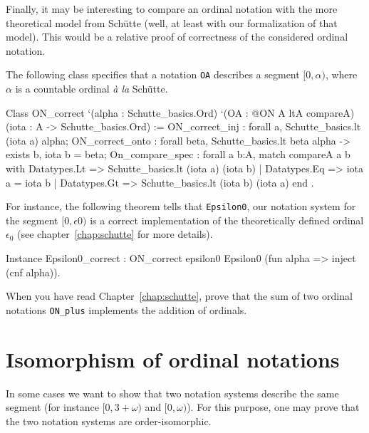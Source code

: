 Finally, it may be interesting to compare an ordinal notation with the more theoretical model from Schütte (well, at least with our formalization of that model). This would be a relative proof of correctness of the considered  ordinal  notation.

The following class specifies that a notation \texttt{OA} describes a segment $[0,\alpha)$,
where $\alpha$ is a countable ordinal \emph{à la}  Schütte.


\label{types:ON-for}

\begin{Coqsrc}
Class ON_correct `(alpha : Schutte_basics.Ord)
     `(OA : @ON A ltA  compareA)
      (iota : A -> Schutte_basics.Ord) :=
  { ON_correct_inj : forall a, Schutte_basics.lt (iota a) alpha;
    ON_correct_onto : forall beta, Schutte_basics.lt beta alpha ->
                                exists b, iota b = beta;
    On_compare_spec : forall a b:A,
        match compareA a b with
          Datatypes.Lt => Schutte_basics.lt (iota a) (iota b)
        | Datatypes.Eq => iota a = iota b
        | Datatypes.Gt => Schutte_basics.lt (iota b) (iota a)
        end
}.
\end{Coqsrc}



For instance, the following theorem tells that \texttt{Epsilon0}, our notation system for the segment $[0,\epsilon0)$ is a correct implementation of the theoretically defined  ordinal $\epsilon_0$
(see chapter~\ref{chap:schutte} for more details).


\begin{Coqsrc}
Instance Epsilon0_correct :
  ON_correct epsilon0 Epsilon0  (fun alpha => inject (cnf alpha)).
\end{Coqsrc}


\begin{project}
  When you have read Chapter~\ref{chap:schutte}, prove that the sum of two ordinal notations \texttt{ON\_plus} implements the addition of ordinals.
\end{project}





\section{Isomorphism of ordinal notations}


In some cases we want to show that two notation systems describe the same segment (for instance $[0,3+\omega)$ and $[0,\omega)$\;). For this purpose, one may prove that the two notation systems are order-isomorphic.

